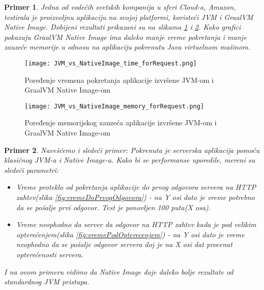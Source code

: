 \documentclass[a4paper]{article}
\newtheorem{primer}{Primer}[section]
\begin{document}
\begin{primer}
Jedna od vodećih svetskih kompanija u sferi Cloud-a, \textit{Amazon}, testirala \cite{AWS_istraživanje} je proizvoljnu aplikaciju na svojoj platformi, koristeći JVM i GraalVM Native Image. Dobijeni rezultati prikazani su na slikama \ref{fig:poređenjeVremena} i \ref{fig:poređenjeMemorije}. Kako grafici pokazuju GraalVM Native Image ima daleko manje vreme pokretanja i manje zauzeće memorije u odnosu na aplikaciju pokrenutu Java virtuelnom mašinom. 
\end{primer}

    
\begin{figure}[h!]
\begin{center}
\texttt{[image: JVM\_vs\_NativeImage\_time\_forRequest.png]}
\end{center}
\caption{Poređenje vremena pokretanja aplikacije izvršene JVM-om i GraalVM Native Image-om}
\label{fig:poređenjeVremena}
\end{figure}


\begin{figure}[h!]
\begin{center}
\texttt{[image: JVM\_vs\_NativeImage\_memory\_forRequest.png]}
\end{center}
\caption{Poređenje memorijskog zauzeća aplikacije izvršene JVM-om i GraalVM Native Image-om}
\label{fig:poređenjeMemorije}
\end{figure}


\newpage
\begin{primer}
Navešćemo i sledeći primer\cite{WebServisi}: Pokrenuta je serverska aplikacija pomoću klasičnog JVM-a i Native Image-a. Kako bi se performanse uporedile, mereni su sledeći parametri:
\begin{itemize}
    \item Vreme proteklo od pokretanja aplikacije do prvog odgovora servera na HTTP zahtev(slika \ref{fig:vremeDoPrvogOdgovora}) - na Y osi dato je vreme potrebno da se pošalje prvi odgovor. Test je ponovljen 100 puta(X osa). 
    \item Vreme neophodno da server da odgovor na HTTP zahtev kada je pod velikim opterećenjem(slika \ref{fig:vremePodOpterecenjem}) - na Y osi dato je vreme neophodno da se pošalje odgovor servera doj je na X osi dat procenat opterećenosti servera.
\end{itemize}
I na ovom primeru vidimo da Native Image daje daleko bolje rezultate od standardnog JVM pristupa.
\end{primer}
\end{document}
